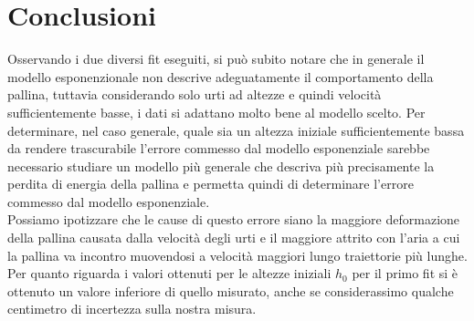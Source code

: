 \documentclass[a4paper]{article}
\begin{document}
    \section{Conclusioni}
    Osservando i due diversi fit eseguiti, si può subito notare che in generale il
    modello esponenzionale non descrive adeguatamente il comportamento della pallina,
    tuttavia considerando solo urti ad altezze e quindi velocità sufficientemente basse,
    i dati si adattano molto bene al modello scelto. Per determinare, nel caso generale,
    quale sia un altezza iniziale sufficientemente bassa da rendere trascurabile l'errore
    commesso dal modello esponenziale sarebbe necessario studiare un modello più generale
    che descriva più precisamente la perdita di energia della pallina e permetta quindi
    di determinare l'errore commesso dal modello esponenziale.\\
    Possiamo ipotizzare che le cause di questo errore siano la maggiore deformazione della
    pallina causata dalla velocità degli urti e il maggiore attrito con l'aria a cui la 
    pallina va incontro muovendosi a velocità maggiori lungo traiettorie più lunghe.\\
    Per quanto riguarda i valori ottenuti per le altezze iniziali $h_0$ per il primo fit
    si è ottenuto un valore inferiore di quello misurato, anche se considerassimo
    qualche centimetro di incertezza sulla nostra misura.
\end{document}
